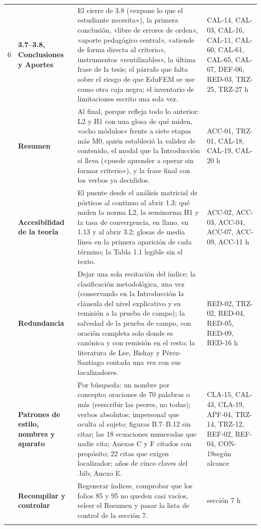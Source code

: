 {\begin{longtable}{@{}L{0.7cm}L{3.8cm}L{7.9cm}L{2.6cm}@{}}
6 & \textbf{3.7–3.8, Conclusiones y Aportes} & El cierre de 3.8 («expone lo que el estudiante necesita»), la primera conclusión, «libre de errores de orden», «aporte pedagógico central», «atiende de forma directa al criterio», instrumentos «reutilizables», la última frase de la tesis; el párrafo que falta sobre el riesgo de que EduFEM se use como otra caja negra; el inventario de limitaciones escrito una sola vez. & CAL-14, CAL-03, CAL-16, CAL-11, CAL-60, CAL-61, CAL-65, CAL-67, DEF-06, RED-03, TRZ-25, TRZ-27 h\\ & \textbf{Resumen} & Al final, porque refleja todo lo anterior: L2 y H1 con una glosa de qué miden, «ocho módulos» frente a siete etapas más M0, quién estableció la validez de contenido, el modal que la Introducción sí lleva («puede aprender a operar sin formar criterio»), y la frase final con los verbos ya decididos. & ACC-01, TRZ-01, CAL-18, CAL-19, CAL-20 h\\ & \textbf{Accesibilidad de la teoría} & El puente desde el análisis matricial de pórticos al continuo al abrir 1.3; qué miden la norma L2, la seminorma H1 y la tasa de convergencia, en llano, en 1.13 y al abrir 3.2; glosas de media línea en la primera aparición de cada término; la Tabla 1.1 legible sin el texto. & ACC-02, ACC-03, ACC-04, ACC-07, ACC-09, ACC-11 h\\ & \textbf{Redundancia} & Dejar una sola recitación del índice; la clasificación metodológica, una vez (conservando en la Introducción la cláusula del nivel explicativo y su remisión a la prueba de campo); la salvedad de la prueba de campo, con oración completa solo donde es canónica y con remisión en el resto; la literatura de Lee, Bishay y Pérez-Santiago contada una vez con sus localizadores. & RED-02, TRZ-02, RED-04, RED-05, RED-09, RED-16 h\\ & \textbf{Patrones de estilo, nombres y aparato} & Por búsqueda: un nombre por concepto; oraciones de 70 palabras o más (reescribir las peores, no todas); verbos absolutos; impersonal que oculta al sujeto; figuras B.7–B.12 sin citar; las 18 ecuaciones numeradas que nadie cita; Anexos C y F citados con propósito; 22 citas que exigen localizador; años de cinco claves del .bib; Anexo E. & CLA-15, CAL-43, CLA-19, APF-04, TRZ-14, TRZ-12, REF-02, REF-04, CON-19\newline según alcance\\ & \textbf{Recompilar y controlar} & Regenerar índices, comprobar que los folios 85 y 95 no queden casi vacíos, releer el Resumen y pasar la lista de control de la sección 7. & sección 7 h\\\addlinespace[4pt]
\end{longtable}}
